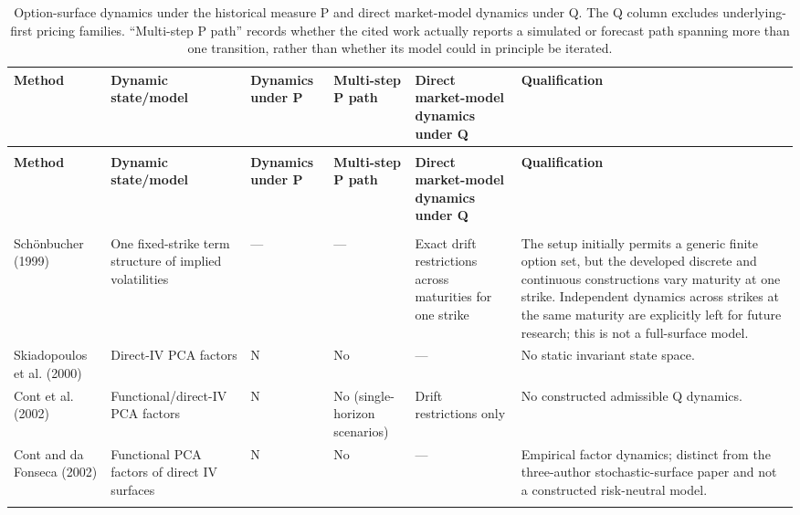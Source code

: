 \documentclass[11pt,a4paper]{article}
\begin{document}
\begin{landscape}
\begingroup
\fontsize{9}{10.5}\selectfont
\setlength{\tabcolsep}{4pt}
\renewcommand{\arraystretch}{1.12}
\setlength{\LTcapwidth}{\linewidth}
\setcounter{table}{16}
\begin{longtable}{@{}>{\raggedright\arraybackslash}p{31mm}>{\raggedright\arraybackslash}p{39mm}>{\raggedright\arraybackslash}p{29mm}>{\raggedright\arraybackslash}p{25mm}>{\raggedright\arraybackslash}p{50mm}>{\raggedright\arraybackslash}p{58mm}@{}}
\caption{Option-surface dynamics under the historical measure P and direct market-model dynamics under Q. The Q column excludes underlying-first pricing families. “Multi-step P path” records whether the cited work actually reports a simulated or forecast path spanning more than one transition, rather than whether its model could in principle be iterated.}\label{tab:surface-dynamics-literature}\\
\toprule
\textbf{Method} & \textbf{Dynamic state/model} & \textbf{Dynamics under P} & \textbf{Multi-step P path} & \textbf{Direct market-model dynamics under Q} & \textbf{Qualification} \\
\midrule
\endfirsthead
\multicolumn{6}{l}{\textbf{Table 17 -- continued}}\\[6pt]
\toprule
\textbf{Method} & \textbf{Dynamic state/model} & \textbf{Dynamics under P} & \textbf{Multi-step P path} & \textbf{Direct market-model dynamics under Q} & \textbf{Qualification} \\
\midrule
\endhead
\midrule
\multicolumn{6}{r}{Continued on next page}\\
\endfoot
\bottomrule
\endlastfoot
Schönbucher (1999) & One fixed-strike term structure of implied volatilities & — & — & Exact drift restrictions across maturities for one strike & The setup initially permits a generic finite option set, but the developed discrete and continuous constructions vary maturity at one strike. Independent dynamics across strikes at the same maturity are explicitly left for future research; this is not a full-surface model. \\ \addlinespace[4pt]
Skiadopoulos et al. (2000) & Direct-IV PCA factors & N & No & — & No static invariant state space. \\ \addlinespace[4pt]
Cont et al. (2002) & Functional/direct-IV PCA factors & N & No (single-horizon scenarios) & Drift restrictions only & No constructed admissible Q dynamics. \\ \addlinespace[4pt]
Cont and da Fonseca (2002) & Functional PCA factors of direct IV surfaces & N & No & — & Empirical factor dynamics; distinct from the three-author stochastic-surface paper and not a constructed risk-neutral model. \\ \addlinespace[4pt]

\end{longtable}
\end{landscape}
\end{document}
